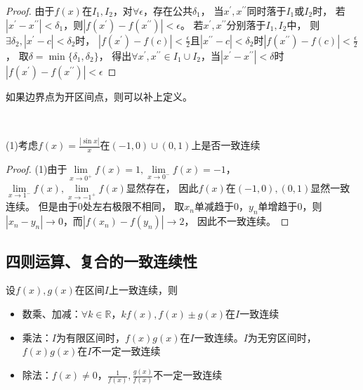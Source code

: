 \begin{proof}
  由于$f(x)$在$I_1,I_2$，对$\forall \epsilon$，存在公共$\delta_1$，
  当$x^{\prime},x^{\prime\prime}$同时落于$I_1$或$I_2$时，
  若$|x^{\prime} - x^{\prime\prime}| < \delta_1$，则$|f(x^{\prime}) - f(x^{\prime\prime})| < \epsilon$。
  若$x^{\prime},x^{\prime\prime}$分别落于$I_1,I_2$中，
  则$\exists \delta_2, |x^{\prime} - c| < \delta_2$时，
  $|f(x^{\prime}) - f(c)| < \frac{\epsilon}{2}$且$|x^{\prime\prime} - c| < \delta_2$时$|f(x^{\prime\prime}) - f(c)| < \frac{\epsilon}{2}$，
  取$\delta = \min \{\delta_1,\delta_2\}$，
  得出$\forall x^{\prime},x^{\prime\prime} \in I_1 \cup I_2$，当$|x^{\prime} - x^{\prime\prime}| < \delta$时
  $|f(x^{\prime}) - f(x^{\prime\prime})| < \epsilon$
\end{proof}

\begin{note}
  如果边界点为开区间点，则可以补上定义。
\end{note}

~

\begin{exercise}[区间合并练习]
  (1)考虑$f(x) = \frac{|\sin x|}{x}$在$(-1,0) \cup (0,1)$上是否一致连续
\end{exercise}

\begin{proof}
  (1)由于$\lim \limits _{x \rightarrow 0^+}f(x) = 1, \lim \limits _{x \rightarrow 0^-}f(x) = -1$，
  $\lim \limits _{x \rightarrow 1^-}f(x), \lim \limits _{x \rightarrow -1^+}f(x)$显然存在，
  因此$f(x)$在$(-1,0),(0,1)$显然一致连续。
  但是由于$0$处左右极限不相同，
  取$x_n$单减趋于$0$，$y_n$单增趋于$0$，则$|x_n - y_n| \rightarrow 0$，而$|f(x_n) - f(y_n)| \rightarrow 2$，
  因此不一致连续。
\end{proof}

\subsection{四则运算、复合的一致连续性}

\begin{theorem}[四则运算的一致连续性]
  设$f(x),g(x)$在区间$I$上一致连续，则
  \begin{itemize}
  \item 数乘、加减：$\forall k \in \mathbb{R}$，$kf(x), f(x) \pm g(x)$在$I$一致连续 
  \item 乘法：$I$为有限区间时，$f(x)g(x)$在$I$一致连续。$I$为无穷区间时，$f(x)g(x)$在$I$不一定一致连续
  \item 除法：$f(x) \neq 0$，$\frac{1}{f(x)}, \frac{g(x)}{f(x)}$不一定一致连续
  \end{itemize}
\end{theorem}

